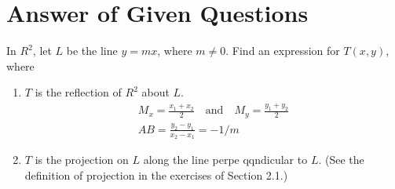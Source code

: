 \documentclass[10pt, oneside]{article}
\begin{document}
\section{Answer of Given Questions}

In $R^2$, let $L$ be the line $y = mx$, where $m \neq 0$. Find an expression for $T(x, y)$, where
\begin{enumerate}
	\item $T$ is the reflection of $R^2$ about $L$.
	      \[
		      \begin{split}
			      M_x = \frac{x_1 + x_2}{2} \quad \text{and} \quad M_y = \frac{y_1 + y_2}{2} \\
			      AB = \frac{y_2 - y_1}{x_2 - x_1} = -1/m
		      \end{split}
	      \]
	\item $T$ is the projection on $L$ along the line perpe qqndicular to $L$. (See the definition of projection in the exercises of Section 2.1.)
\end{enumerate}
\end{document}
